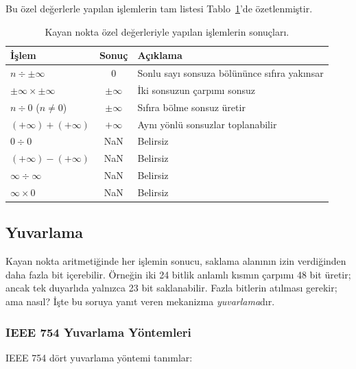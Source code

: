 Bu özel değerlerle yapılan işlemlerin tam listesi Tablo~\ref{tab:ozel-degerler}'de özetlenmiştir.

\begin{table}[htbp]
\centering
\caption[Özel değerlerle yapılan işlemler]{Kayan nokta özel değerleriyle yapılan işlemlerin sonuçları.}
\label{tab:ozel-degerler}
\small
\begin{tabular}{l c l}
\toprule
\textbf{İşlem} & \textbf{Sonuç} & \textbf{Açıklama} \\
\midrule
$n \div \pm\infty$ & $0$ & Sonlu sayı sonsuza bölününce sıfıra yakınsar \\
$\pm\infty \times \pm\infty$ & $\pm\infty$ & İki sonsuzun çarpımı sonsuz \\
$n \div 0$ \; ($n \neq 0$) & $\pm\infty$ & Sıfıra bölme sonsuz üretir \\
$(+\infty) + (+\infty)$ & $+\infty$ & Aynı yönlü sonsuzlar toplanabilir \\
\midrule
$0 \div 0$ & NaN & Belirsiz \\
$(+\infty) - (+\infty)$ & NaN & Belirsiz \\
$\infty \div \infty$ & NaN & Belirsiz \\
$\infty \times 0$ & NaN & Belirsiz \\
\bottomrule
\end{tabular}
\end{table}

\subsection{Yuvarlama}

Kayan nokta aritmetiğinde her işlemin sonucu, saklama alanının izin verdiğinden daha fazla bit içerebilir. Örneğin iki 24 bitlik anlamlı kısmın çarpımı 48 bit üretir; ancak tek duyarlıda yalnızca 23 bit saklanabilir. Fazla bitlerin atılması gerekir; ama nasıl? İşte bu soruya yanıt veren mekanizma \emph{yuvarlama}dır.

\subsubsection{IEEE 754 Yuvarlama Yöntemleri}

IEEE 754 dört yuvarlama yöntemi tanımlar:

